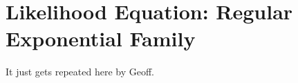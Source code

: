 \chapter[Lec 1:]{Likelihood Equation: Regular Exponential Family}


It just gets repeated here by Geoff.






